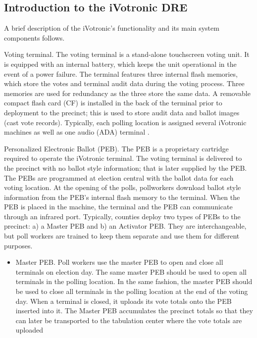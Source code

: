 \documentclass[letterpaper,twocolumn,10pt]{article}
\begin{document}
\subsection{Introduction to the iVotronic DRE}
A brief description of the iVotronic's functionality and its main system
components follows.  

\begin{description}
\item{Voting terminal.} The voting terminal is a stand-alone touchscreen voting
  unit. It is equipped with an internal battery, which keeps the unit operational 
  in the event of a power failure.  The terminal 
  features three internal flash memories, which store the votes and terminal audit 
  data during the voting process. Three memories are used for redundancy as the 
  three store the same data.  A removable compact flash card (CF) is installed in 
  the back of the terminal prior to deployment to the precinct; this is 
  used to store audit data and ballot images (cast vote records). Typically, 
  each polling location is assigned several iVotronic machines as well as one audio 
  (ADA) terminal .
\item{Personalized Electronic Ballot (PEB).} The PEB is a proprietary cartridge
  required to operate the iVotronic terminal. The voting terminal is 
  delivered to the precinct with no ballot style information; that is later supplied 
  by the PEB. The PEBs are programmed at election central with the ballot data
  for each voting location. At the opening of the polls, pollworkers 
  download ballot style information from the PEB's internal flash memory to the terminal.  When the PEB is 
  placed in the 
  machine, the terminal and the PEB can communicate through an infrared port.  
  Typically, counties deploy two types of PEBs to the precinct: a) a Master PEB
  and b) an Activator PEB. They are interchangeable, but poll workers are trained 
  to keep them separate and use them for different purposes.
\begin{itemize}
\item{Master PEB.} Poll workers use the master PEB to open and close all
  terminals on election day. The same master PEB should be used to open all 
  terminals in the polling location.  In the same fashion, the master PEB should
  be used to close all terminals in the polling location at the end of the voting
  day.  When a terminal is closed, it uploads its vote totals onto the PEB 
  inserted into it. The Master PEB accumulates the precinct totals so that they can 
  later be transported to the tabulation center where the vote totals are uploaded 

\end{itemize}
\end{description}
\end{document}
